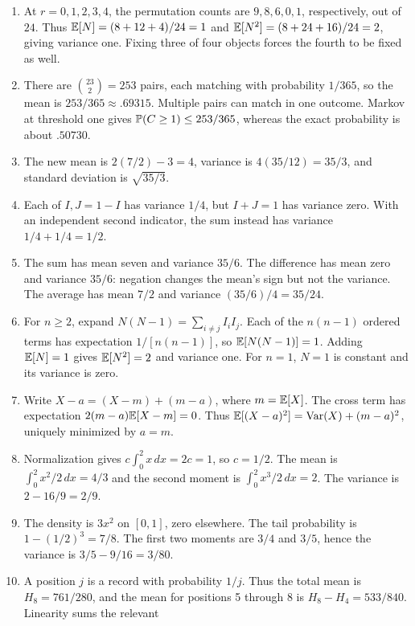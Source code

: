\begin{enumerate}
 The mean is $-1+1/3+2/3=0$, and the second moment is
 $2+1/3+8/3=5$, so the variance is five.
 The positive-payoff probability is $1/3+1/6=1/2$.
 After a fee of one, the net values are $-3,0,3$: the mean is $-1$,
 variance remains five, and the probability of a positive net payoff
 becomes $1/6$.
 \item At $r=0,1,2,3,4$, the permutation counts are $9,8,6,0,1$,
 respectively, out of $24$. Thus $\E[N]=(8+12+4)/24=1$ and
 $\E[N^2]=(8+24+16)/24=2$, giving variance one.
 Fixing three of four objects forces the fourth to be fixed as well.
 \item There are $\binom{23}{2}=253$ pairs, each matching with
 probability $1/365$, so the mean is $253/365\approx.69315$.
 Multiple pairs can match in one outcome. Markov at threshold one
 gives $\P(C\ge1)\le253/365$, whereas the exact probability is about $.50730$.
 \item The new mean is $2(7/2)-3=4$, variance is
 $4(35/12)=35/3$, and standard deviation is $\sqrt{35/3}$.
 \item Each of $I,J=1-I$ has variance $1/4$, but $I+J=1$
 has variance zero. With an independent second indicator, the
 sum instead has variance $1/4+1/4=1/2$.
 \item The sum has mean seven and variance $35/6$.
 The difference has mean zero and variance $35/6$:
 negation changes the mean's sign but not the variance.
 The average has mean $7/2$ and variance $(35/6)/4=35/24$.
 \item For $n\ge2$, expand
 $N(N-1)=\sum_{i\ne j}I_iI_j$. Each of the $n(n-1)$ ordered
 terms has expectation $1/[n(n-1)]$, so $\E[N(N-1)]=1$.
 Adding $\E[N]=1$ gives $\E[N^2]=2$ and variance one.
 For $n=1$, $N=1$ is constant and its variance is zero.
 \item Write $X-a=(X-m)+(m-a)$, where $m=\E[X]$.
 The cross term has expectation $2(m-a)\E[X-m]=0$.
 Thus $\E[(X-a)^2]=\Var(X)+(m-a)^2$, uniquely minimized by $a=m$.
 \item Normalization gives $c\int_0^2x\,dx=2c=1$, so $c=1/2$.
 The mean is $\int_0^2x^2/2\,dx=4/3$ and the second moment is
 $\int_0^2x^3/2\,dx=2$. The variance is $2-16/9=2/9$.
 \item The density is $3x^2$ on $[0,1]$, zero elsewhere.
 The tail probability is $1-(1/2)^3=7/8$.
 The first two moments are $3/4$ and $3/5$,
 hence the variance is $3/5-9/16=3/80$.
 \item A position $j$ is a record with probability $1/j$.
 Thus the total mean is $H_8=761/280$, and the mean for positions
 5 through 8 is $H_8-H_4=533/840$. Linearity sums the relevant

\end{enumerate}
